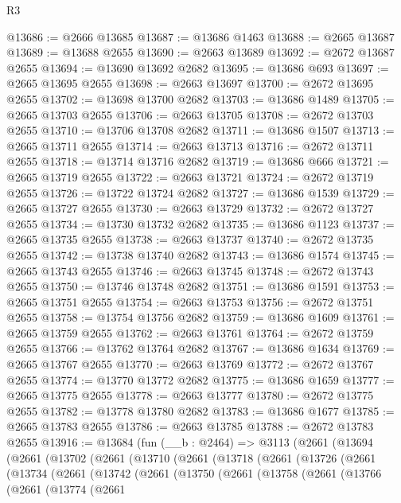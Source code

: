\begin{lexlean}{R3}
\begin{coremodule}
@13686 := @2666 @13685
@13687 := @13686 @1463
@13688 := @2665 @13687
@13689 := @13688 @2655
@13690 := @2663 @13689
@13692 := @2672 @13687 @2655
@13694 := @13690 @13692 @2682
@13695 := @13686 @693
@13697 := @2665 @13695 @2655
@13698 := @2663 @13697
@13700 := @2672 @13695 @2655
@13702 := @13698 @13700 @2682
@13703 := @13686 @1489
@13705 := @2665 @13703 @2655
@13706 := @2663 @13705
@13708 := @2672 @13703 @2655
@13710 := @13706 @13708 @2682
@13711 := @13686 @1507
@13713 := @2665 @13711 @2655
@13714 := @2663 @13713
@13716 := @2672 @13711 @2655
@13718 := @13714 @13716 @2682
@13719 := @13686 @666
@13721 := @2665 @13719 @2655
@13722 := @2663 @13721
@13724 := @2672 @13719 @2655
@13726 := @13722 @13724 @2682
@13727 := @13686 @1539
@13729 := @2665 @13727 @2655
@13730 := @2663 @13729
@13732 := @2672 @13727 @2655
@13734 := @13730 @13732 @2682
@13735 := @13686 @1123
@13737 := @2665 @13735 @2655
@13738 := @2663 @13737
@13740 := @2672 @13735 @2655
@13742 := @13738 @13740 @2682
@13743 := @13686 @1574
@13745 := @2665 @13743 @2655
@13746 := @2663 @13745
@13748 := @2672 @13743 @2655
@13750 := @13746 @13748 @2682
@13751 := @13686 @1591
@13753 := @2665 @13751 @2655
@13754 := @2663 @13753
@13756 := @2672 @13751 @2655
@13758 := @13754 @13756 @2682
@13759 := @13686 @1609
@13761 := @2665 @13759 @2655
@13762 := @2663 @13761
@13764 := @2672 @13759 @2655
@13766 := @13762 @13764 @2682
@13767 := @13686 @1634
@13769 := @2665 @13767 @2655
@13770 := @2663 @13769
@13772 := @2672 @13767 @2655
@13774 := @13770 @13772 @2682
@13775 := @13686 @1659
@13777 := @2665 @13775 @2655
@13778 := @2663 @13777
@13780 := @2672 @13775 @2655
@13782 := @13778 @13780 @2682
@13783 := @13686 @1677
@13785 := @2665 @13783 @2655
@13786 := @2663 @13785
@13788 := @2672 @13783 @2655
@13916 := @13684
    (fun (__b : @2464) =>
    @3113
      (@2661
        (@13694
          (@2661
            (@13702
              (@2661
                (@13710
                  (@2661
                    (@13718
                      (@2661
                        (@13726
                          (@2661
                            (@13734
                              (@2661
                                (@13742
                                  (@2661
                                    (@13750
                                      (@2661
                                        (@13758
                                          (@2661
                                            (@13766
                                              (@2661
                                                (@13774
                                                  (@2661

\end{coremodule}
\end{lexlean}
